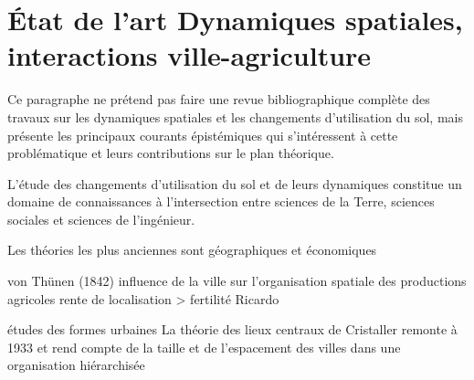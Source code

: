 \section{
	État de l'art
	Dynamiques spatiales, interactions ville-agriculture
}

Ce paragraphe ne prétend pas faire une revue bibliographique complète
des travaux sur les dynamiques spatiales et
les changements d'utilisation du sol,
mais présente les principaux courants épistémiques
qui s'intéressent à cette problématique et
leurs contributions sur le plan théorique.

L'étude des changements d'utilisation du sol et de leurs dynamiques
constitue un domaine de connaissances à l'intersection entre
sciences de la Terre, sciences sociales et sciences de l'ingénieur.

Les théories les plus anciennes sont géographiques et économiques

von Thünen (1842) influence de la ville sur l'organisation spatiale des productions agricoles
rente de localisation > fertilité Ricardo

études des formes urbaines
La théorie des lieux centraux de Cristaller remonte à 1933
et rend compte de la taille et de l'espacement des villes dans
une organisation hiérarchisée 


